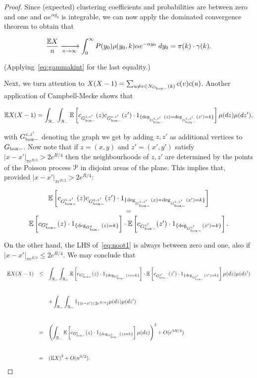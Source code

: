 \begin{proof}
Since (expected) clustering coefficients and probabilities are between zero and one and $\alpha e^{\alpha y_0}$ is integrable, we can now apply the dominated 
convergence theorem to obtain that 

\begin{equation}\label{eq:EXn} 
\frac{{\mathbb E} X}{n} \xrightarrow[n\to\infty]{} \int_0^\infty P(y_0) \rho(y_0,k)\alpha e^{-\alpha y_0}\;dy_0 = {\pi}(k) \cdot \gamma(k).  
\end{equation}

\noindent
(Applying~\eqref{eq:gammakint} for the last equality.)

Next, we turn attention to $X(X-1) = \sum_{u\neq v \in N_{G_{\mathrm{box}-}}(k)} c(v)c(u)$.
Another application of Campbell-Mecke shows that 

$$
{\mathbb E} X(X-1) 
= 
\int_{{\mathcal R}_-}\int_{{\mathcal R}_-} {\mathbb E}\left[ c_{G_{\mathrm{box}-}^{z,z'}}(z)c_{G_{\mathrm{box}-}^{z,z'}}(z') \cdot 
1_{\{\text{deg}_{G_{\mathrm{box}-}^{z,z'}}(z)=\text{deg}_{G_{\mathrm{box}-}^{z,z'}}(z')=k\}}\right]\mu(dz)\mu(dz'),
$$

\noindent
with $G_{\mathrm{box}-}^{z,z'}$ denoting the graph we get by adding $z, z'$ as additional vertices to $G_{\mathrm{box}-}$.
Now note that if $z=(x,y)$ and $z'=(x',y')$ satisfy $|x-x'|_{\pi e^{R/2}} > 2 e^{R/4}$ then 
the neighbourhoods of $z,z'$ are determined by the points of the Poisson process ${\mathcal P}$ in disjoint areas
of the plane.
This implies that, provided $|x-x'|_{\pi e^{R/2}} > 2 e^{R/4}$:

\begin{equation}\label{eq:noot1} 
\begin{array}{c} 
{\mathbb E}\left[ c_{G_{\mathrm{box}-}^{z,z'}}(z)c_{G_{\mathrm{box}-}^{z,z'}}(z') \cdot 
1_{\{\text{deg}_{G_{\mathrm{box}-}^{z,z'}}(z)=\text{deg}_{G_{\mathrm{box}-}^{z,z'}}(z')=k\}}\right] \\
= \\
{\mathbb E}\left[ c_{G_{\mathrm{box}-}^{z}}(z) \cdot 
1_{\{\text{deg}_{G_{\mathrm{box}-}^{z}}(z)=k\}}\right] \cdot 
{\mathbb E}\left[ c_{G_{\mathrm{box}-}^{z'}}(z') \cdot 
1_{\{\text{deg}_{G_{\mathrm{box}-}^{z'}}(z')=k\}}\right].
\end{array} 
\end{equation}

\noindent
On the other hand, the LHS of~\eqref{eq:noot1} is always between zero and one, also if $|x-x'|_{\pi e^{R/2}} \leq 2 e^{R/4}$. 
We may conclude that 

$$ \begin{array}{rcl} 
\Ee X(X-1) 
& \leq & \displaystyle  
\int_{\Rcal_-}\int_{\Rcal_-} \Ee\left[ c_{\GboxH^{z}}(z) \cdot 
1_{\{\text{deg}_{\GboxH^{z}}(z)=k\}}\right] %
\cdot 
\Ee\left[ c_{\GboxH^{z'}}(z') \cdot 
1_{\{\text{deg}_{\GboxH^{z'}}(z')=k\}}\right] \mu(dz)\mu(dz') \\[8ex]
& & \displaystyle 
+ \int_{\Rcal_-}\int_{\Rcal_-} 1_{\{|x-x'|\leq 2e^{R/4}\}} \mu(dz)\mu(dz') \\[8ex]
& = & \displaystyle
\left( \int_{\Rcal_-} \Ee\left[ c_{\GboxH^z}(z) \cdot 1_{\{\text{deg}_{\GboxH^z}(z)=k\}}\right] \mu(dz) \right)^2
+ O( e^{3R/4} ) \\[8ex] 
& = & \displaystyle
\left(\Ee X\right)^2 + O( n^{3/2} ).
\end{array} $$


\end{proof}
